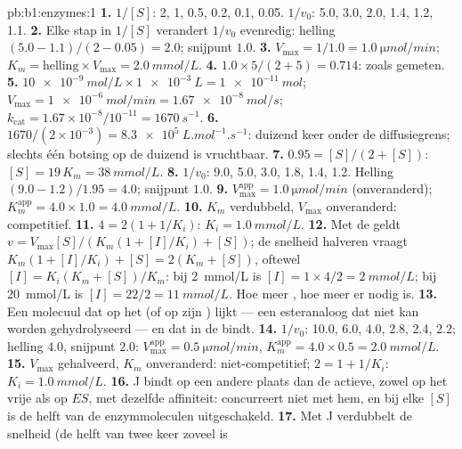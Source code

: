 \begin{solution}{pb:b1:enzymes:1}
\textbf{1.} $1/[S]$: 2, 1, 0.5, 0.2, 0.1, 0.05. $1/v_0$: 5.0, 3.0, 2.0, 1.4,
1.2, 1.1.
\textbf{2.} Elke stap in $1/[S]$ verandert $1/v_0$ evenredig: helling
$(5.0 - 1.1)/(2 - 0.05) = 2.0$; snijpunt $1.0$.
\textbf{3.} $V_{\max} = 1/1.0 = \qty{1.0}{\micro mol/min}$; $K_m =
\text{helling}\times V_{\max} = \qty{2.0}{mmol/L}$.
\textbf{4.} $1.0\times 5/(2 + 5) = 0.714$: zoals gemeten.
\textbf{5.} $\qty{10e-9}{mol/L}\times\qty{1e-3}{L} = \qty{1e-11}{mol}$;
$V_{\max} = \qty{1e-6}{mol/min} = \qty{1.67e-8}{mol/s}$;
$k_{\text{cat}} = 1.67\times 10^{-8}/10^{-11} = \qty{1670}{s^{-1}}$.
\textbf{6.} $1670/(2\times 10^{-3}) = \qty{8.3e5}{L.mol^{-1}.s^{-1}}$: duizend
keer onder de diffusiegrens; slechts één botsing op de duizend is vruchtbaar.
\textbf{7.} $0.95 = [S]/(2 + [S])$: $[S] = 19\,K_m = \qty{38}{mmol/L}$.
\textbf{8.} $1/v_0$: 9.0, 5.0, 3.0, 1.8, 1.4, 1.2. Helling $(9.0 -
1.2)/1.95 = 4.0$; snijpunt $1.0$.
\textbf{9.} $V_{\max}^{\text{app}} = \qty{1.0}{\micro mol/min}$ (onveranderd);
$K_m^{\text{app}} = 4.0\times 1.0 = \qty{4.0}{mmol/L}$.
\textbf{10.} $K_m$ verdubbeld, $V_{\max}$ onveranderd: competitief.
\textbf{11.} $4 = 2(1 + 1/K_i)$: $K_i = \qty{1.0}{mmol/L}$.
\textbf{12.} Met de  geldt $v = V_{\max}[S]/(K_m(1 + [I]/K_i) +
[S])$; de snelheid halveren vraagt $K_m(1 + [I]/K_i) + [S] = 2(K_m +
[S])$, oftewel $[I] = K_i(K_m + [S])/K_m$: bij \qty{2}{mmol/L} is $[I] =
1\times 4/2 = \qty{2}{mmol/L}$; bij \qty{20}{mmol/L} is $[I] = 22/2 =
\qty{11}{mmol/L}$. Hoe meer , hoe meer  er nodig is.
\textbf{13.} Een molecuul dat op het  (of op zijn )
lijkt --- een esteranaloog dat niet kan worden gehydrolyseerd --- en dat in de
 bindt.
\textbf{14.} $1/v_0$: 10.0, 6.0, 4.0, 2.8, 2.4, 2.2; helling $4.0$, snijpunt
$2.0$: $V_{\max}^{\text{app}} = \qty{0.5}{\micro mol/min}$,
$K_m^{\text{app}} = 4.0\times 0.5 = \qty{2.0}{mmol/L}$.
\textbf{15.} $V_{\max}$ gehalveerd, $K_m$ onveranderd: niet-competitief;
$2 = 1 + 1/K_i$: $K_i = \qty{1.0}{mmol/L}$.
\textbf{16.} J bindt op een andere plaats dan de actieve, zowel op het vrije 
als op $ES$, met dezelfde affiniteit:  concurreert niet met hem, en bij
elke $[S]$ is de helft van de enzymmoleculen uitgeschakeld.
\textbf{17.} Met J verdubbelt de snelheid (de helft van twee keer zoveel  is

\end{solution}
